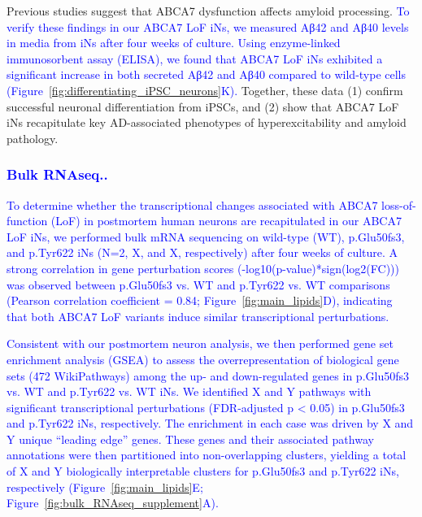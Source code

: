 Previous studies suggest that ABCA7 dysfunction affects amyloid processing\cite{Satoh2015-yu,Sakae2016-uy,Bamji-Mirza2018-xt,Chan2008-qu,De_Roeck2018-zx}. \textcolor{blue}{To verify these findings in our ABCA7 LoF iNs, we measured Aβ42 and Aβ40 levels in media from iNs after four weeks of culture. Using enzyme-linked immunosorbent assay (ELISA), we found that ABCA7 LoF iNs exhibited a significant increase in both secreted Aβ42 and Aβ40 compared to wild-type cells (Figure~\ref{fig:differentiating_iPSC_neurons}K).} Together, these data (1) confirm successful neuronal differentiation from iPSCs, and (2) show that ABCA7 LoF iNs recapitulate key AD-associated phenotypes of hyperexcitability and amyloid pathology.

\subsubsection{\textcolor{blue}{Bulk RNAseq..}}
\textcolor{blue}{To determine whether the transcriptional changes associated with ABCA7 loss-of-function (LoF) in postmortem human neurons are recapitulated in our ABCA7 LoF iNs, we performed bulk mRNA sequencing on wild-type (WT), p.Glu50fs3, and p.Tyr622 iNs (N=2, X, and X, respectively) after four weeks of culture. A strong correlation in gene perturbation scores (-log10(p-value)*sign(log2(FC))) was observed between p.Glu50fs3 vs. WT and p.Tyr622 vs. WT comparisons (Pearson correlation coefficient = 0.84; Figure~\ref{fig:main_lipids}D), indicating that both ABCA7 LoF variants induce similar transcriptional perturbations.}

\textcolor{blue}{Consistent with our postmortem neuron analysis, we then performed gene set enrichment analysis (GSEA) to assess the overrepresentation of biological gene sets (472 WikiPathways) among the up- and down-regulated genes in p.Glu50fs3 vs. WT and p.Tyr622 vs. WT iNs. We identified X and Y pathways with significant transcriptional perturbations (FDR-adjusted p < 0.05) in p.Glu50fs3 and p.Tyr622 iNs, respectively. The enrichment in each case was driven by X and Y unique “leading edge” genes\cite{Subramanian2005-pu}. These genes and their associated pathway annotations were then partitioned into non-overlapping clusters, yielding a total of X and Y biologically interpretable clusters for p.Glu50fs3 and p.Tyr622 iNs, respectively (Figure~\ref{fig:main_lipids}E; Figure~\ref{fig:bulk_RNAseq_supplement}A).} 

